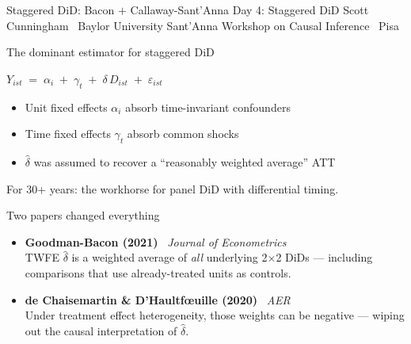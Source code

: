 \documentclass[aspectratio=169,11pt]{beamer}
\begin{document}

\codechellatitle
  {Staggered DiD: Bacon $+$ Callaway-Sant'Anna}
  {Day 4: Staggered DiD}
  {Scott Cunningham \textperiodcentered\ Baylor University}
  {Sant'Anna Workshop on Causal Inference \textperiodcentered\ Pisa}

\begin{frame}{The dominant estimator for staggered DiD}
\vspace{0.6em}
\begin{center}
\large
$Y_{ist} \;=\; \alpha_i \;+\; \gamma_t \;+\; \delta\, D_{ist} \;+\; \varepsilon_{ist}$
\end{center}
\vspace{0.8em}
\begin{itemize}\setlength\itemsep{0.5em}
  \item Unit fixed effects $\alpha_i$ absorb time-invariant confounders
  \item Time fixed effects $\gamma_t$ absorb common shocks
  \item $\hat\delta$ was assumed to recover a ``reasonably weighted average'' ATT
\end{itemize}
\vspace{0.5em}
\begin{center}\color{warmgray}\small
For 30+ years: the workhorse for panel DiD with differential timing.
\end{center}
\end{frame}

\begin{frame}{Two papers changed everything}
\vspace{0.8em}
\begin{itemize}\setlength\itemsep{0.7em}
  \item \textbf{Goodman-Bacon (2021)} \textperiodcentered\ \textit{Journal of Econometrics}\\
        {\small\color{warmgray} TWFE $\hat\delta$ is a weighted average of \textit{all} underlying 2$\times$2 DiDs --- including comparisons that use already-treated units as controls.}

  \item \textbf{de Chaisemartin \& D'Haultf\oe{}uille (2020)} \textperiodcentered\ \textit{AER}\\
        {\small\color{warmgray} Under treatment effect heterogeneity, those weights can be negative --- wiping out the causal interpretation of $\hat\delta$.}
\end{itemize}
\vspace{0.7em}
\begin{center}
\end{center}
\end{frame}
\end{document}
